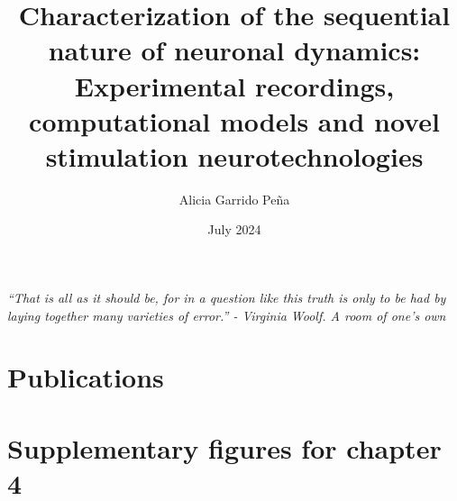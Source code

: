 \documentclass[11pt,a4paper,twoside]{book} %
\title{Characterization of the sequential nature of neuronal dynamics: Experimental recordings, computational models and novel stimulation neurotechnologies}
\author{Alicia Garrido Peña}
\date{July 2024}
\numberwithin{equation}{section}
\begin{document}
 \maketitle

 \newpage
 \newpage
 \clearpage
 \vfill
 \vspace{100pt}
 {\centering \large \textit{``That is all as it should be, for in a question like this truth is only to be had by laying together many
 		varieties of error.'' - Virginia Woolf. A room of one's own}\par}

 \vfill
 
 


\clearpage
\newpage
%

 \tableofcontents
 \listoftables
 \listoffigures

 \newpage



\resetpagenumbering

 
 
 
 

 
 
 


\printbibliography


\begin{appendix}
\chapter{Publications}

\begin{refsection}
\nocite{*}

\printbibliography[heading={subbibliography},title={Journal Publications},keyword=journal]

\printbibliography[heading={subbibliography},title={International Conference Contributions},keyword=conference]

\end{refsection}

\chapter{Supplementary figures for chapter 4}



%
% 


\end{appendix}
\end{document}

